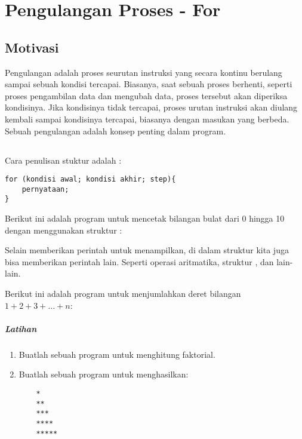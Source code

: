 \documentclass[../main.tex]{subfiles}
\begin{document}
\chapter{Pengulangan Proses - For}
\section{Motivasi}
Pengulangan adalah proses seurutan instruksi yang secara kontinu berulang sampai
sebuah kondisi tercapai. Biasanya, saat sebuah proses berhenti, seperti proses
pengambilan data dan mengubah data, proses tersebut akan diperiksa kondisinya.
Jika kondisinya tidak tercapai, proses urutan instruksi akan diulang kembali
sampai kondisinya tercapai, biasanya dengan masukan yang berbeda. Sebuah
pengulangan adalah konsep penting dalam program.

\section{}
Cara penulisan stuktur  adalah :

\begin{verbatim}
for (kondisi awal; kondisi akhir; step){
	pernyataan;
}
\end{verbatim}

Berikut ini adalah program untuk mencetak bilangan bulat dari 0 hingga 10 dengan
menggunakan struktur :


Selain memberikan perintah untuk menampilkan, di dalam struktur  kita
juga bisa memberikan perintah lain. Seperti operasi aritmatika, struktur
, dan lain-lain.

Berikut ini adalah program untuk menjumlahkan deret bilangan
\(1 + 2 + 3 + \ldots + n\):


\paragraph{Latihan}
\begin{enumerate}
  \item Buatlah sebuah program untuk menghitung faktorial.
  \item Buatlah sebuah program untuk menghasilkan:

	\begin{verbatim}
	*
	**
	***
	****
	*****
	\end{verbatim}
\end{enumerate}
\end{document}
